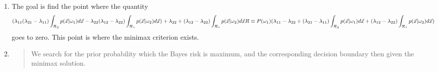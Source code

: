 \documentclass[11pt]{article}
\begin{document}
\begin{enumerate}
\begin{eqnarray*}
		\int _{\mathcal{R}_2} \lambda_{21} p(\vec{x} | \omega_1 )  d\vec{x} - 
		\int _{\mathcal{R}_1} \lambda_{12} p(\vec{x}|\omega_2 )  d\vec{x}   - 
		\int _{\mathcal{R}_1} \lambda_{12} p(\vec{x}|\omega_2 )  d\vec{x}- 
		\int _{\mathcal{R}_2} \lambda_{22} p(\vec{x} | \omega_2)  d\vec{x} )
		+  
		 \lambda_{22} + (\lambda_{12} - \lambda_{22}) \int _{\mathcal{R}_1} p(\vec{x} | \omega_2) d\vec{x} 
		 \\
		R \equiv P(\omega_1 )(\lambda_{11}\int _{\mathcal{R}_1}   p(\vec{x}| \omega_1 )  d\vec{x}  +  
		\lambda_{21} \int _{\mathcal{R}_2}  p(\vec{x} | \omega_1 )  d\vec{x} - 
		\lambda_{12}\int _{\mathcal{R}_1}  p(\vec{x}|\omega_2 )  d\vec{x}- 
		\lambda_{22} \int _{\mathcal{R}_2}  p(\vec{x} | \omega_2)  d\vec{x} )
		+  
		 \lambda_{22} + (\lambda_{12} - \lambda_{22}) \int _{\mathcal{R}_1} p(\vec{x} | \omega_2) d\vec{x} 
		 \\
		R \equiv P(\omega_1 )( \lambda_{11} - \lambda_{11}\int _{\mathcal{R}_2}   p(\vec{x}| \omega_1 )  d\vec{x}  +  
		\lambda_{21} \int _{\mathcal{R}_2}  p(\vec{x} | \omega_1 )  d\vec{x} - 
		\lambda_{12}\int _{\mathcal{R}_1}  p(\vec{x}|\omega_2 )  d\vec{x}- 
		\lambda_{22} - \lambda_{22} \int _{\mathcal{R}_1}  p(\vec{x} | \omega_2)  d\vec{x} )
		+  
		 \lambda_{22} + (\lambda_{12} - \lambda_{22}) \int _{\mathcal{R}_1} p(\vec{x} | \omega_2) d\vec{x} 
		 \\
		R \equiv P(\omega_1 )( \lambda_{11} (\lambda_{21}- \lambda_{11})\int _{\mathcal{R}_2}   p(\vec{x}| \omega_1 )  d\vec{x}  - 
		\lambda_{22} (\lambda_{12} - \lambda_{22}) \int _{\mathcal{R}_1}  p(\vec{x} | \omega_2)  d\vec{x} )
		+  
		 \lambda_{22} + (\lambda_{12} - \lambda_{22}) \int _{\mathcal{R}_1} p(\vec{x} | \omega_2) d\vec{x} \\
		R \equiv P(\omega_1 )( \lambda_{11} - \lambda_{22} + 
		(\lambda_{21}- \lambda_{11})\int _{\mathcal{R}_2}   p(\vec{x}| \omega_1 )  d\vec{x}  + 
		(\lambda_{12} - \lambda_{22}) \int _{\mathcal{R}_1}  p(\vec{x} | \omega_2)  d\vec{x} )
		+  
		 \lambda_{22} + (\lambda_{12} - \lambda_{22}) \int _{\mathcal{R}_1} p(\vec{x} | \omega_2) d\vec{x} 
		 \\
	\end{eqnarray*}
	\item The goal is find the point where the quantity
	\[
	( \lambda_{11} (\lambda_{21}- \lambda_{11})\int _{\mathcal{R}_2}   p(\vec{x}| \omega_1 )  d\vec{x}  - 
	\lambda_{22} (\lambda_{12} - \lambda_{22}) \int _{\mathcal{R}_1}  p(\vec{x} | \omega_2)  d\vec{x} )
	+  
	 \lambda_{22} + (\lambda_{12} - \lambda_{22}) \int _{\mathcal{R}_1} p(\vec{x} | \omega_2) d\vec{x} \\
	R \equiv P(\omega_1 )( \lambda_{11} - \lambda_{22} + 
	(\lambda_{21}- \lambda_{11})\int _{\mathcal{R}_2}   p(\vec{x}| \omega_1 )  d\vec{x}  + 
	(\lambda_{12} - \lambda_{22}) \int _{\mathcal{R}_1}  p(\vec{x} | \omega_2)  d\vec{x} )
	\]
	goes to zero.  This point is where the minimax criterion exists.  
	\item 
	\begin{quote}
		We search for the prior probability which the Bayes risk is maximum, and the corresponding decision boundary then given the minimax solution.  
	

\end{quote}
\end{enumerate}
\end{document}
